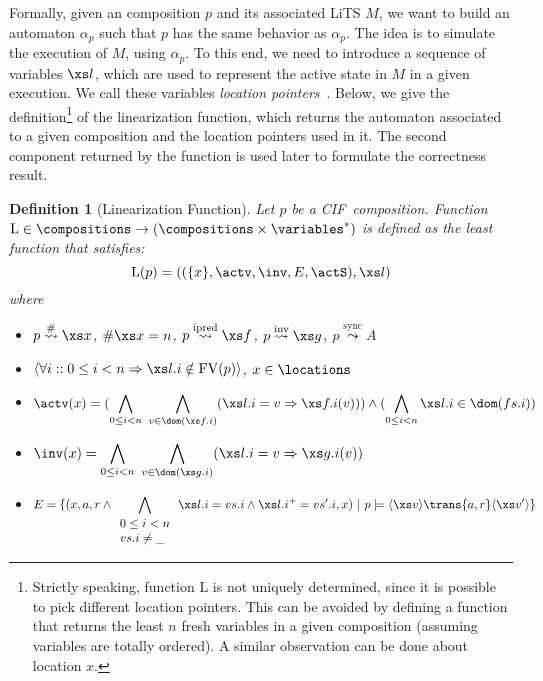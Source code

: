 \documentclass[submission,copyright,creativecommons,sharealike]{eptcs}
\newcommand{\CIF}{{CIF}}
\newcommand{\sstate}[1]{\ensuremath{\langle #1 \rangle}}
\newcommand{\saof}[0]{
\ensuremath{\stackrel {\mathrm{sync}} {\leadsto}}
}
\newcommand{\compsof}[0]{
\ensuremath{\stackrel {\mathrm{\#}} {\leadsto}}
}
\newcommand{\ipredof}[0]{
\ensuremath{\stackrel {\mathrm{ipred}} {\leadsto}}
}
\newcommand{\invof}[0]{
\ensuremath{\stackrel {\mathrm{inv}} {\leadsto}}
}
\newcommand{\lfunfs}{\ensuremath{\mathrm{L}}}
\newcommand{\lfun}[1]{\ensuremath{\lfunfs(#1)}}
\newtheorem{definition}{Definition}
\begin{document}
Formally, given an composition $p$ and its associated LiTS $M$, we want to
build an automaton $\alpha_p$ such that $p$ has the same behavior as
$\alpha_p$.
The idea is to simulate the execution of $M$, using $\alpha_p$.
To this end, we need to introduce a sequence of variables $\xs l$,
which are used to represent the active state in $M$ in a given
execution. We call these variables \emph{location
  pointers}~\cite{Khadim3:LinHChiPCTech07}.
Below, we give the definition\footnote{Strictly speaking, function
  $\lfunfs$ is not uniquely determined, since it is possible to pick
  different location pointers. This can be avoided by defining a function
  that returns the least $n$ fresh variables in a given composition
  (assuming variables are totally ordered). A similar observation can
  be done about location $x$.} of the linearization
function, which returns the automaton associated to a given
composition and the location pointers used in it. The second component
returned by the function is used later to formulate the correctness result.


\begin{definition}[Linearization Function]
  Let $p$ be a \CIF\ composition. Function $\lfunfs \in \compositions
  \rightarrow (\compositions \times \variables^*)$ is defined as the
  least function that satisfies:
  \begin{equation*}
    \lfun{p} = ((\{x\}, \actv, \inv, E, \actS), \xs l)
  \end{equation*}
  where
  \begin{itemize}
  \item $p \compsof \xs x$, $\#\xs x = n$, $p \ipredof \xs f$, $p
    \invof \xs g$, $p \saof A$
  \item $\langle \forall i :: 0 \leq i < n \Rightarrow \xs l {.} i \notin
    \mathrm{FV}(p) \rangle$, $x \in \locations$
  \item $\actv(x) = (\displaystyle \bigwedge_{0 \leq i < n}\
    \displaystyle \bigwedge_{v \in \dom (\xs f{.}i)} (\xs l {.} i = v
    \Rightarrow \xs f {.} i(v)) ) \wedge (\displaystyle \bigwedge_{0
      \leq i < n} \xs l {.} i \in \dom(fs.i))$
  \item $\inv(x) = \displaystyle \bigwedge_{0 \leq i < n}\
    \displaystyle \bigwedge_{v \in \dom (\xs g{.}i)} (\xs l {.} i = v
    \Rightarrow \xs g {.} i(v))$
  \item $E = \{ (x, a, r \wedge \displaystyle \bigwedge_{
      \begin{array}{l}
         0 \leq i < n\\
        vs.i \neq \_
      \end{array}} \xs l {.} i = vs{.}i \wedge \xs l {.} i^+ =
    vs'{.}i, x) \ |\ p \models
    \sstate{\xs v}\trans{a, r}\sstate{\xs v'}\}$
  \end{itemize}
\end{definition}
\end{document}
